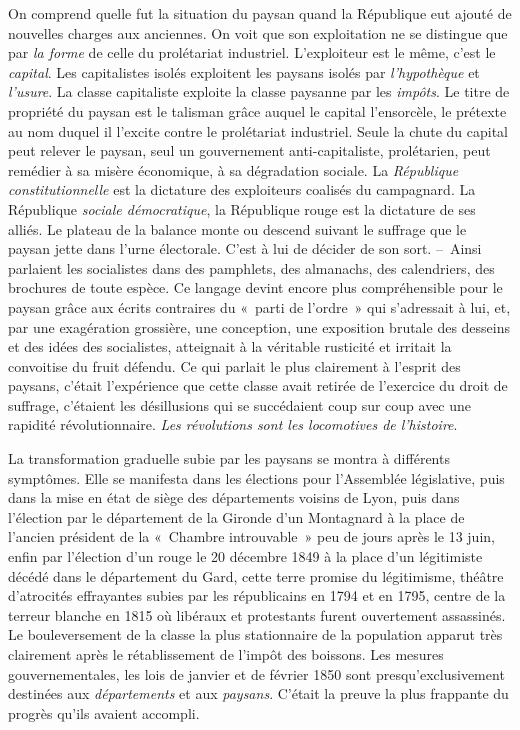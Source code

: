 \documentclass[french,twoside]{book} %
\begin{document}
On comprend quelle fut la situation du paysan quand la République eut ajouté de nouvelles charges aux anciennes. On voit que son exploitation ne se distingue que par \emph{la forme} de celle du prolétariat industriel. L’exploiteur est le même, c’est le \emph{capital}. Les capitalistes isolés exploitent les paysans isolés par \emph{l’hypothèque} et \emph{l’usure}. La classe capitaliste exploite la classe paysanne par les \emph{impôts}. Le titre de propriété du paysan est le talisman grâce auquel le capital l’ensorcèle, le prétexte au nom duquel il l’excite contre le prolétariat industriel. Seule la chute du capital peut relever le paysan, seul un gouvernement anti-capitaliste, prolétarien, peut remédier à sa misère économique, à sa dégradation sociale. La \emph{République constitutionnelle} est la dictature des exploiteurs coalisés du campagnard. La République \emph{sociale démocratique}, la République rouge est la dictature de ses alliés. Le plateau de la balance monte ou descend suivant le suffrage que le paysan jette dans l’urne électorale. C’est à lui de décider de son sort. – Ainsi parlaient les socialistes dans des pamphlets, des almanachs, des calendriers, des brochures de toute espèce. Ce langage devint encore plus compréhensible pour le paysan grâce aux écrits contraires du « parti de l’ordre » qui s’adressait à lui, et, par une exagération grossière, une conception, une exposition brutale des desseins et des idées des socialistes, atteignait à la véritable rusticité et irritait la convoitise du fruit défendu. Ce qui parlait le plus clairement à l’esprit des paysans, c’était l’expérience que cette classe avait retirée de l’exercice du droit de suffrage, c’étaient les désillusions qui se succédaient coup sur coup avec une rapidité révolutionnaire. \emph{Les révolutions sont les locomotives de l’histoire}.\par
La transformation graduelle subie par les paysans se montra à différents symptômes. Elle se manifesta dans les élections pour l’Assemblée législative, puis dans la mise en état de siège des départements voisins de Lyon, puis dans l’élection par le département de la Gironde d’un Montagnard à la place de l’ancien président de la « Chambre introuvable » peu de jours après le 13 juin, enfin par l’élection d’un rouge le 20 décembre 1849 à la place d’un légitimiste décédé dans le département du Gard, cette terre promise du légitimisme, théâtre d’atrocités effrayantes subies par les républicains en 1794 et en 1795, centre de la terreur blanche en 1815 où libéraux et protestants furent ouvertement assassinés. Le bouleversement de la classe la plus stationnaire de la population apparut très clairement après le rétablissement de l’impôt des boissons. Les mesures gouvernementales, les lois de janvier et de février 1850 sont presqu’exclusivement destinées aux \emph{départements} et aux \emph{paysans}. C’était la preuve la plus frappante du progrès qu’ils avaient accompli.\par
\end{document}
